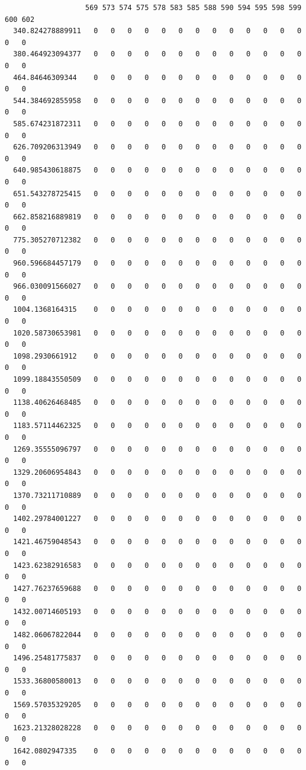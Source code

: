 \documentclass[
  letterpaper,
  DIV=11,
  numbers=noendperiod]{scrartcl}
\begin{document}
\begin{verbatim}
                   569 573 574 575 578 583 585 588 590 594 595 598 599 600 602
  340.824278889911   0   0   0   0   0   0   0   0   0   0   0   0   0   0   0
  380.464923094377   0   0   0   0   0   0   0   0   0   0   0   0   0   0   0
  464.84646309344    0   0   0   0   0   0   0   0   0   0   0   0   0   0   0
  544.384692855958   0   0   0   0   0   0   0   0   0   0   0   0   0   0   0
  585.674231872311   0   0   0   0   0   0   0   0   0   0   0   0   0   0   0
  626.709206313949   0   0   0   0   0   0   0   0   0   0   0   0   0   0   0
  640.985430618875   0   0   0   0   0   0   0   0   0   0   0   0   0   0   0
  651.543278725415   0   0   0   0   0   0   0   0   0   0   0   0   0   0   0
  662.858216889819   0   0   0   0   0   0   0   0   0   0   0   0   0   0   0
  775.305270712382   0   0   0   0   0   0   0   0   0   0   0   0   0   0   0
  960.596684457179   0   0   0   0   0   0   0   0   0   0   0   0   0   0   0
  966.030091566027   0   0   0   0   0   0   0   0   0   0   0   0   0   0   0
  1004.1368164315    0   0   0   0   0   0   0   0   0   0   0   0   0   0   0
  1020.58730653981   0   0   0   0   0   0   0   0   0   0   0   0   0   0   0
  1098.2930661912    0   0   0   0   0   0   0   0   0   0   0   0   0   0   0
  1099.18843550509   0   0   0   0   0   0   0   0   0   0   0   0   0   0   0
  1138.40626468485   0   0   0   0   0   0   0   0   0   0   0   0   0   0   0
  1183.57114462325   0   0   0   0   0   0   0   0   0   0   0   0   0   0   0
  1269.35555096797   0   0   0   0   0   0   0   0   0   0   0   0   0   0   0
  1329.20606954843   0   0   0   0   0   0   0   0   0   0   0   0   0   0   0
  1370.73211710889   0   0   0   0   0   0   0   0   0   0   0   0   0   0   0
  1402.29784001227   0   0   0   0   0   0   0   0   0   0   0   0   0   0   0
  1421.46759048543   0   0   0   0   0   0   0   0   0   0   0   0   0   0   0
  1423.62382916583   0   0   0   0   0   0   0   0   0   0   0   0   0   0   0
  1427.76237659688   0   0   0   0   0   0   0   0   0   0   0   0   0   0   0
  1432.00714605193   0   0   0   0   0   0   0   0   0   0   0   0   0   0   0
  1482.06067822044   0   0   0   0   0   0   0   0   0   0   0   0   0   0   0
  1496.25481775837   0   0   0   0   0   0   0   0   0   0   0   0   0   0   0
  1533.36800580013   0   0   0   0   0   0   0   0   0   0   0   0   0   0   0
  1569.57035329205   0   0   0   0   0   0   0   0   0   0   0   0   0   0   0
  1623.21328028228   0   0   0   0   0   0   0   0   0   0   0   0   0   0   0
  1642.0802947335    0   0   0   0   0   0   0   0   0   0   0   0   0   0   0

\end{verbatim}
\end{document}
